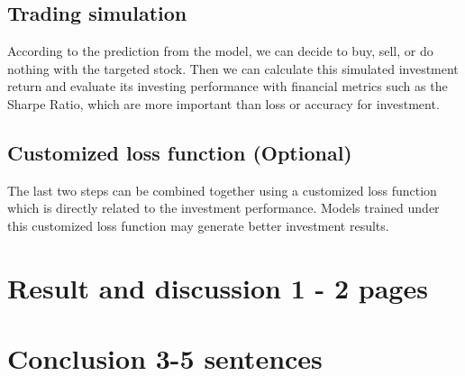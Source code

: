 \documentclass[11pt]{article}
\begin{document}
\subsection{Trading simulation}
According to the prediction from the model, we can decide to buy, sell, or do nothing with the targeted stock. Then we can calculate this simulated investment return and evaluate its investing performance with financial metrics such as the Sharpe Ratio, which are more important than loss or accuracy for investment.

\subsection{Customized loss function (Optional)}
The last two steps can be combined together using a customized loss function which is directly related to the investment performance. Models trained under this customized loss function may generate better investment results.

\section{Result and discussion 1 - 2 pages}

\section{Conclusion 3-5 sentences}




\end{document}
